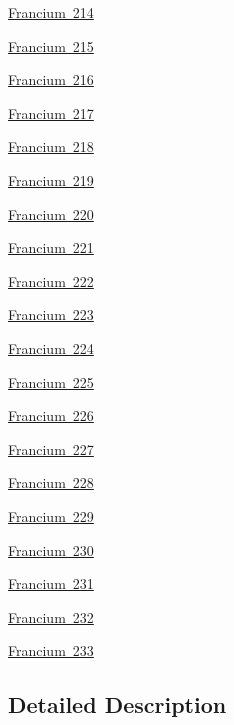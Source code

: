 \begin{DoxyCompactItemize}
\mbox{\hyperlink{group___isotope_const-_francium-_fr214}{Francium 214}}
\item 
\mbox{\hyperlink{group___isotope_const-_francium-_fr215}{Francium 215}}
\item 
\mbox{\hyperlink{group___isotope_const-_francium-_fr216}{Francium 216}}
\item 
\mbox{\hyperlink{group___isotope_const-_francium-_fr217}{Francium 217}}
\item 
\mbox{\hyperlink{group___isotope_const-_francium-_fr218}{Francium 218}}
\item 
\mbox{\hyperlink{group___isotope_const-_francium-_fr219}{Francium 219}}
\item 
\mbox{\hyperlink{group___isotope_const-_francium-_fr220}{Francium 220}}
\item 
\mbox{\hyperlink{group___isotope_const-_francium-_fr221}{Francium 221}}
\item 
\mbox{\hyperlink{group___isotope_const-_francium-_fr222}{Francium 222}}
\item 
\mbox{\hyperlink{group___isotope_const-_francium-_fr223}{Francium 223}}
\item 
\mbox{\hyperlink{group___isotope_const-_francium-_fr224}{Francium 224}}
\item 
\mbox{\hyperlink{group___isotope_const-_francium-_fr225}{Francium 225}}
\item 
\mbox{\hyperlink{group___isotope_const-_francium-_fr226}{Francium 226}}
\item 
\mbox{\hyperlink{group___isotope_const-_francium-_fr227}{Francium 227}}
\item 
\mbox{\hyperlink{group___isotope_const-_francium-_fr228}{Francium 228}}
\item 
\mbox{\hyperlink{group___isotope_const-_francium-_fr229}{Francium 229}}
\item 
\mbox{\hyperlink{group___isotope_const-_francium-_fr230}{Francium 230}}
\item 
\mbox{\hyperlink{group___isotope_const-_francium-_fr231}{Francium 231}}
\item 
\mbox{\hyperlink{group___isotope_const-_francium-_fr232}{Francium 232}}
\item 
\mbox{\hyperlink{group___isotope_const-_francium-_fr233}{Francium 233}}
\end{DoxyCompactItemize}


\subsection{Detailed Description}

